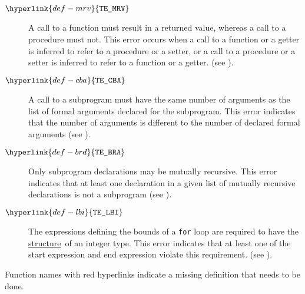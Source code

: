 \documentclass{book}
\newcommand\structure[0]{\hyperlink{def-structure}{structure}}
\newcommand\TypeErrorCode[1]{\texttt{TE\_#1}}
\newcommand\MismatchedReturnValue[0]{\hyperlink{def-mrv}{\TypeErrorCode{MRV}}}
\newcommand\CallBadArity[0]{\hyperlink{def-cba}{\TypeErrorCode{CBA}}}
\newcommand\BadRecursiveDecls[0]{\hyperlink{def-brd}{\TypeErrorCode{BRA}}}
\newcommand\RequireIntegerForLoopBounds[0]{\hyperlink{def-lbi}{\TypeErrorCode{LBI}}}
\begin{document}
\begin{description}
\hypertarget{def-mrv}{}
\item[$\MismatchedReturnValue$]
A call to a function must result in a returned value,
whereas a call to a procedure must not.
This error occurs when a call to a function or a getter is inferred to refer to a procedure or a setter,
or a call to a procedure or a setter is inferred to refer to a function or a getter.
(see ).

\hypertarget{def-cba}{}
\item[$\CallBadArity$]
A call to a subprogram must have the same number of arguments as the list of formal arguments
declared for the subprogram.
This error indicates that the number of arguments is different to the number of declared formal arguments
(see ).

\hypertarget{def-brd}{}
\item[$\BadRecursiveDecls$]
Only subprogram declarations may be mutually recursive.
This error indicates that at least one declaration in a given list of mutually recursive declarations
is not a subprogram
(see ).

\hypertarget{def-lbi}{}
\item[$\RequireIntegerForLoopBounds$]
The expressions defining the bounds of a \texttt{for} loop are required to have the \structure\ of
an integer type.
This error indicates that at least one of the start expression and end expression violate this
requirement.
(see ).

\end{description}

\noindent\makebox[\linewidth]{\rule{\linewidth}{0.4pt}}
\hypertarget{tododefine}{}
Function names with red hyperlinks indicate a missing definition that needs to be done.



\end{document}
